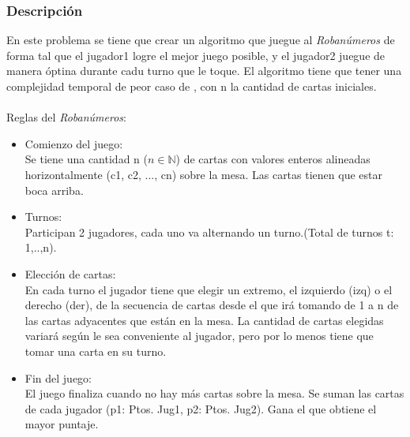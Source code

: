 \documentclass[11pt, a4paper, twoside]{article}
\begin{document}
{}

\subsubsection{Descripción} 

En este problema se tiene que crear un algoritmo que juegue al \textit{Robanúmeros} de forma tal 
que el jugador1 logre el mejor juego posible, y el jugador2 juegue de manera óptina durante cadu turno que le toque.
El algoritmo tiene que tener una complejidad temporal de peor caso de , con n la cantidad de cartas
iniciales.\\
\\
Reglas del \textit{Robanúmeros}: 
\begin{itemize}
	\item Comienzo del juego: \\
	Se tiene una cantidad n ($n \in \mathbb{N}$) de cartas con valores enteros alineadas
	horizontalmente (c1, c2, ..., cn) sobre la mesa. Las cartas tienen que estar boca arriba. 
	\item Turnos: \\
	Participan 2 jugadores, cada uno va alternando un turno.(Total de turnos t: 1,..,n).  
	\item Elección de cartas: \\
	En cada turno el jugador tiene que elegir un extremo, el izquierdo (izq) o el derecho (der), de 
	la secuencia de cartas desde el que irá tomando de 1 a n de las cartas adyacentes que están en la mesa. 
	La cantidad de cartas elegidas variará según le sea conveniente al jugador, pero por lo menos tiene que tomar una 
	carta en su turno. 
	\item Fin del juego: \\
	El juego finaliza cuando no hay más cartas sobre la mesa. Se suman las cartas de cada 
	jugador (p1: Ptos. Jug1, p2: Ptos. Jug2). Gana el que obtiene el mayor puntaje.
\end{itemize}
\end{document}
